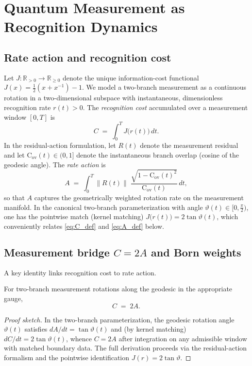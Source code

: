 \documentclass[12pt,a4paper]{article}
\begin{document}
\section{Quantum Measurement as Recognition Dynamics}

\subsection{Rate action and recognition cost}
Let $J:\mathbb{R}_{>0}\!\to\!\mathbb{R}_{\ge 0}$ denote the unique information-cost functional $J(x)=\tfrac{1}{2}(x+x^{-1})-1$. We model a two-branch measurement as a continuous rotation in a two-dimensional subspace with instantaneous, dimensionless recognition rate $r(t)>0$. The \emph{recognition cost} accumulated over a measurement window $[0,T]$ is
\begin{equation}\label{eq:C_def}
  C \;=\; \int_{0}^{T} J\!\bigl(r(t)\bigr)\,dt.
\end{equation}
In the residual-action formulation, let $R(t)$ denote the measurement residual and let $\mathrm{C}_{\mathrm{ov}}(t)\in(0,1]$ denote the instantaneous branch overlap (cosine of the geodesic angle). The \emph{rate action} is
\begin{equation}\label{eq:A_def}
  A \;=\; \int_{0}^{T} \bigl\|R(t)\bigr\|\;
      \frac{\sqrt{1-\mathrm{C}_{\mathrm{ov}}(t)^{2}}}{\mathrm{C}_{\mathrm{ov}}(t)}\,dt,
\end{equation}
so that $A$ captures the geometrically weighted rotation rate on the measurement manifold. In the canonical two-branch parameterization with angle $\vartheta(t)\in[0,\tfrac{\pi}{2})$, one has the pointwise match (kernel matching) $J\!\bigl(r(t)\bigr)=2\tan\vartheta(t)$, which conveniently relates \eqref{eq:C_def} and \eqref{eq:A_def} below.

\subsection{Measurement bridge $C=2A$ and Born weights}
A key identity links recognition cost to rate action.

\begin{theorem}\label{thm:Ceq2A}
For two-branch measurement rotations along the geodesic in the appropriate gauge,
\[
  C \;=\; 2A.
\]
\end{theorem}

\begin{proof}[Proof sketch]
In the two-branch parameterization, the geodesic rotation angle $\vartheta(t)$ satisfies $dA/dt=\tan\vartheta(t)$ and (by kernel matching) $dC/dt=2\tan\vartheta(t)$, whence $C=2A$ after integration on any admissible window with matched boundary data. The full derivation proceeds via the residual-action formalism and the pointwise identification $J(r)=2\tan\vartheta$.
\end{proof}
\end{document}
